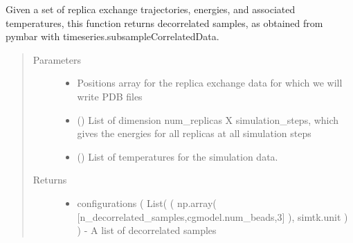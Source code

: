 \documentclass[letterpaper,12pt,english,openany,oneside]{sphinxmanual}
\begin{document}

\begin{fulllineitems}
\label{\detokenize{thermo:parameters.reweight.get_decorrelated_samples}}
Given a set of replica exchange trajectories, energies, and associated temperatures, this function returns decorrelated samples, as obtained from pymbar with timeseries.subsampleCorrelatedData.
\begin{quote}\begin{description}
\item[{Parameters}] \leavevmode\begin{itemize}
\item {} 
 \textendash{} Positions array for the replica exchange data for which we will write PDB files

\item {} 
 (\sphinxstyleliteralemphasis{\sphinxupquote{( }}\sphinxstyleliteralemphasis{\sphinxupquote{( }}\sphinxstyleliteralemphasis{\sphinxupquote{ ) }}\sphinxstyleliteralemphasis{\sphinxupquote{ )}}) \textendash{} List of dimension num\_replicas X simulation\_steps, which gives the energies for all replicas at all simulation steps

\item {} 
 (\sphinxstyleliteralemphasis{\sphinxupquote{( }}\sphinxstyleliteralemphasis{\sphinxupquote{ )}}) \textendash{} List of temperatures for the simulation data.

\end{itemize}

\item[{Returns}] \leavevmode
\begin{itemize}
\item {} 
configurations ( List(  ( np.array( {[}n\_decorrelated\_samples,cgmodel.num\_beads,3{]} ), simtk.unit ) ) - A list of decorrelated samples


\end{itemize}
\end{description}
\end{quote}
\end{fulllineitems}
\end{document}

